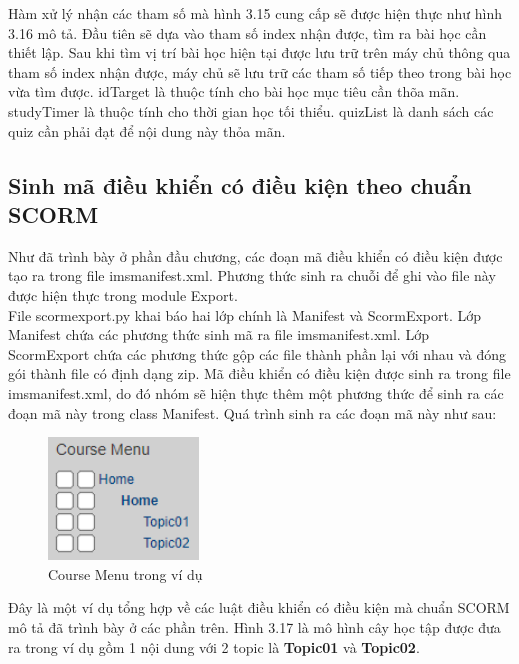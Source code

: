 Hàm xử lý nhận các tham số mà hình 3.15 cung cấp sẽ được hiện thực như hình 3.16 mô tả. Đầu tiên sẽ dựa vào tham số index nhận được, tìm ra bài học cần thiết lập. Sau khi tìm vị trí bài học hiện tại được lưu trữ trên máy chủ thông qua tham số index nhận được, máy chủ sẽ lưu trữ các tham số tiếp theo trong bài học vừa tìm được. idTarget là thuộc tính cho bài học mục tiêu cần thõa mãn. studyTimer là thuộc tính cho thời gian học tối thiểu. quizList là danh sách các quiz cần phải đạt để nội dung này thỏa mãn.



\subsection{Sinh mã điều khiển có điều kiện theo chuẩn SCORM}

	Như đã trình bày ở phần đầu chương, các đoạn mã điều khiển có điều kiện được tạo ra trong file imsmanifest.xml. Phương thức sinh ra chuỗi để ghi vào file này được hiện thực trong module Export. \\
	
	File scormexport.py khai báo hai lớp chính là Manifest và ScormExport. Lớp Manifest chứa các phương thức sinh mã ra file imsmanifest.xml. Lớp ScormExport chứa các phương thức gộp các file thành phần lại với nhau và đóng gói thành file có định dạng zip. Mã điều khiển có điều kiện được sinh ra trong file imsmanifest.xml, do đó nhóm sẽ hiện thực thêm một phương thức để sinh ra các đoạn mã này trong class Manifest. Quá trình sinh ra các đoạn mã này như sau:

	
	\begin{center}
	\begin{figure}[htp]
		\begin{center}
			\includegraphics[width=4cm]{Chapter3/Pictures/picture317.png}
		\end{center}
		\caption{Course Menu trong ví dụ}
		\label{refpicture411}
	\end{figure}
\end{center}


Đây là một ví dụ tổng hợp về các luật điều khiển có điều kiện mà chuẩn SCORM mô tả đã trình bày ở các phần trên. Hình 3.17 là mô hình cây học tập được đưa ra trong ví dụ gồm 1 nội dung với 2 topic là \textbf{Topic01} và \textbf{Topic02}.


